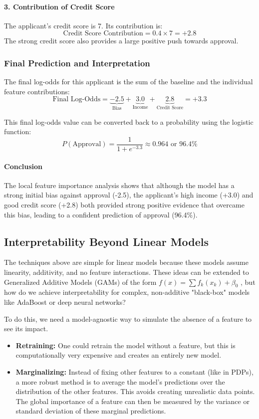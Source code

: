 \documentclass{article}
\begin{document}
\begin{multicols}{2}
\paragraph{3. Contribution of Credit Score} The applicant's credit score is 7. Its contribution is:
$$ \text{Credit Score Contribution} = 0.4 \times 7 = +2.8 $$
The strong credit score also provides a large positive push towards approval.

\subsubsection{Final Prediction and Interpretation}

The final log-odds for this applicant is the sum of the baseline and the individual feature contributions:
$$ \text{Final Log-Odds} = \underbrace{-2.5}_{\text{Bias}} + \underbrace{3.0}_{\text{Income}} + \underbrace{2.8}_{\text{Credit Score}} = +3.3 $$

This final log-odds value can be converted back to a probability using the logistic function:
$$ P(\text{Approval}) = \frac{1}{1 + e^{-3.3}} \approx 0.964 \text{ or } 96.4\% $$

\paragraph{Conclusion} The local feature importance analysis shows that although the model has a strong initial bias against approval (-2.5), the applicant's high income (+3.0) and good credit score (+2.8) both provided strong positive evidence that overcame this bias, leading to a confident prediction of approval (96.4\%).


\subsection{Interpretability Beyond Linear Models}
The techniques above are simple for linear models because these models assume linearity, additivity, and no feature interactions. These ideas can be extended to Generalized Additive Models (GAMs) of the form $f(x) = \sum f_k(x_k) + \beta_0$ , but how do we achieve interpretability for complex, non-additive "black-box" models like AdaBoost or deep neural networks? 

To do this, we need a model-agnostic way to simulate the absence of a feature to see its impact.
\begin{itemize}
    \item \textbf{Retraining:} One could retrain the model without a feature, but this is computationally very expensive and creates an entirely new model.
    \item \textbf{Marginalizing:} Instead of fixing other features to a constant (like in PDPs), a more robust method is to average the model's predictions over the distribution of the other features. This avoids creating unrealistic data points. The global importance of a feature can then be measured by the variance or standard deviation of these marginal predictions.
\end{itemize}


\end{multicols}
\end{document}
